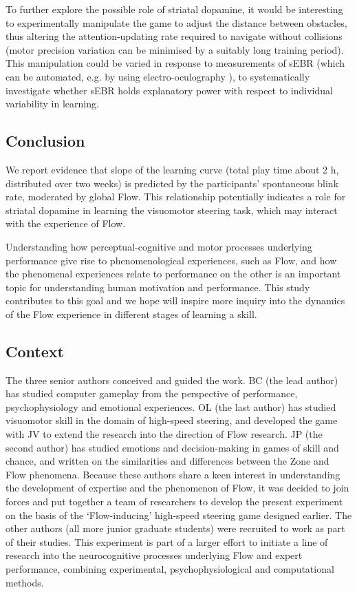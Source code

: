 \documentclass[a4paper,doc,floatsintext,natbib,10pt]{apa6}
\begin{document}
To further explore the possible role of striatal dopamine, it would be interesting to experimentally manipulate the game to adjust the distance between obstacles, thus altering the attention-updating rate required to navigate without collisions (motor precision variation can be minimised by a suitably long training period). This manipulation could be varied in response to measurements of sEBR (which can be automated, e.g. by using electro-oculography \citep{toivanen2014}), to systematically investigate whether sEBR holds explanatory power with respect to individual variability in learning.


\subsection*{Conclusion}

We report evidence that slope of the learning curve (total play time about 2 h, distributed over two weeks) is predicted by the participants' spontaneous blink rate, moderated by global Flow. This relationship potentially indicates a role for striatal dopamine in learning the visuomotor steering task, which may interact with the experience of Flow.

Understanding how perceptual-cognitive and motor processes underlying performance give rise to phenomenological experiences, such as Flow, and how the phenomenal experiences relate to performance on the other is an important topic for understanding human motivation and performance. This study contributes to this goal and we hope will inspire more inquiry into the dynamics of the Flow experience in different stages of learning a skill.


\subsection*{Context}
The three senior authors conceived and guided the work. BC (the lead author) has studied computer gameplay from the perspective of performance, psychophysiology and emotional experiences. OL (the last author) has studied visuomotor skill in the domain of high-speed steering, and developed the game with JV to extend the research into the direction of Flow research. JP (the second author) has studied emotions and decision-making in games of skill and chance, and written on the similarities and differences between the Zone and Flow phenomena. Because these authors share a keen interest in understanding the development of expertise and the phenomenon of Flow, it was decided to join forces and put together a team of researchers to develop the present experiment on the basis of the `Flow-inducing' high-speed steering game designed earlier. The other authors (all more junior graduate students) were recruited to work as part of their studies. This experiment is part of a larger effort to initiate a line of research into the neurocognitive processes underlying Flow and expert performance, combining experimental, psychophysiological and computational methods.
\end{document}
